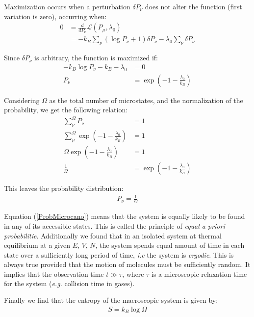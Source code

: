 \documentclass[book.tex]{subfiles}
\begin{document}
Maximization occurs when a perturbation $\delta P_\nu$ does not alter the function (first variation is zero), occurring when:
\begin{align}
0&= \frac{d}{d P_\nu} \mathcal{L}(P_\mu, \lambda_0) \\
&= -k_B\sum_\nu\left(\log P_\nu +1\right) \delta P_\nu - \lambda_0 \sum_\nu\delta P_\nu 
\end{align}

Since $\delta P_\nu$ is arbitrary, the function is maximized if:
\begin{align}
-k_B \log P_\nu - k_B - \lambda_0 &= 0 \\ P_\nu &=\exp\left(-1-\frac{\lambda_0}{k_B}\right) 
\end{align}

Considering $\Omega$ as the total number of microstates, and the normalization of the probability,
we get the following relation:
\begin{align}
\sum_\nu^\Omega P_\nu &= 1 \\
\sum_\mu^\Omega \exp \left ( -1 - \frac{\lambda_0}{k_B} \right ) &= 1\\
\Omega \exp \left ( -1 - \frac{\lambda_0}{k_B} \right ) &= 1 \\
\frac{1}{\Omega} &= \exp\left(-1 - \frac{\lambda_0}{k_B}\right)
\end{align}

This leaves the probability distribution:
\begin{align}\label{ProbMicrocano}
P_\nu = \frac{1}{\Omega}
\end{align}

Equation (\ref{ProbMicrocano}) means that the system is equally likely to be found in any of its accessible states. This is called the principle of \textit{equal a priori probabilitie}. Additionally we found that in an isolated system at thermal equilibrium at a given $E$, $V$, $N$, the system spends equal amount of time in each state over a sufficiently long period of time, \textit{i.e} the system is \textit{ergodic}. This is always true provided that the motion of molecules must be sufficiently random. It implies that the observation time $t\gg \tau$, where $\tau$ is a microscopic relaxation time for the system (\textit{e.g.} collision time in gases).


Finally we find that the entropy of the macroscopic system is given by:
\begin{align}\label{Entropy}
S = k_B \log \Omega
\end{align}
\end{document}
